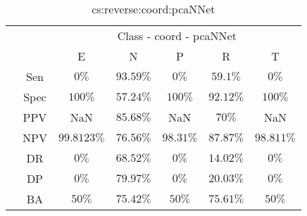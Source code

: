 \begin{table}[!ht]
	\centering
	\begin{tabular}{|c|c|c|c|c|c|c|}
		\cline{3-7}
		\multicolumn{2}{c|}{} & \multicolumn{5}{c|}{Class - coord - pcaNNet} \\ \cline{3-7}
		\multicolumn{2}{c|}{} & E & N & P & R & T \\ \hline
		\multirow{7}{*}{\rotatebox{90}{Statistics}} & Sen & $0\%$ & $93.59\%$ & $0\%$ & $59.1\%$ & $0\%$ \\ \cline{2-7}
		 & Spec & $100\%$ & $57.24\%$ & $100\%$ & $92.12\%$ & $100\%$ \\ \cline{2-7}
		 & PPV & NaN & $85.68\%$ & NaN & $70\%$ & NaN \\ \cline{2-7}
		 & NPV & $99.8123\%$ & $76.56\%$ & $98.31\%$ & $87.87\%$ & $98.811\%$ \\ \cline{2-7}
		 & DR & $0\%$ & $68.52\%$ & $0\%$ & $14.02\%$ & $0\%$ \\ \cline{2-7}
		 & DP & $0\%$ & $79.97\%$ & $0\%$ & $20.03\%$ & $0\%$ \\ \cline{2-7}
		 & BA & $50\%$ & $75.42\%$ & $50\%$ & $75.61\%$ & $50\%$ \\ \hline
	\end{tabular}
	\caption{cs:reverse:coord:pcaNNet}
	\label{tab:cs:reverse:coord:pcaNNet}
\end{table}
